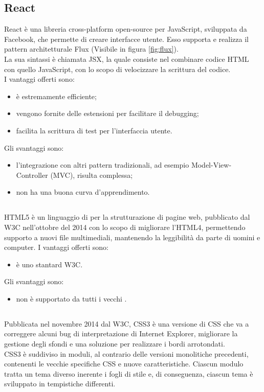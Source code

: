 \subsection{React}
React è una libreria cross-platform open-source per JavaScript, sviluppata da Facebook, che permette di creare interfacce utente. Esso supporta e realizza il pattern architetturale Flux (Visibile in figura \ref{fig:flux}). \\
La sua sintassi è chiamata JSX, la quale consiste nel combinare codice HTML con quello JavaScript, con lo scopo di velocizzare la scrittura del codice.\\
I vantaggi offerti sono:
\begin{itemize}
	\item è estremamente efficiente;
	\item vengono fornite delle estensioni per facilitare il debugging;
	\item facilita la scrittura di test per l'interfaccia utente.
\end{itemize}
Gli svantaggi sono:
\begin{itemize}
	\item l'integrazione con altri pattern tradizionali, ad esempio Model-View-Controller (MVC), risulta complessa;
	\item non ha una buona curva d'apprendimento.
\end{itemize}
\subsection{}
HTML5 è un linguaggio di  per la strutturazione di pagine web, pubblicato dal W3C nell’ottobre del 2014 con lo scopo di migliorare l’HTML4, permettendo supporto a nuovi file multimediali, mantenendo la leggibilità da parte di uomini e computer.
I vantaggi offerti sono:
\begin{itemize}
	\item è uno stantard W3C.
\end{itemize}
Gli svantaggi sono:
\begin{itemize}
	\item non è supportato da tutti i vecchi .
\end{itemize}
\subsection{}
Pubblicata nel novembre 2014 dal W3C, CSS3 è una versione di CSS che va a correggere alcuni bug di interpretazione di Internet Explorer, migliorare la gestione degli sfondi e una soluzione per realizzare i bordi arrotondati.\\
CSS3 è suddiviso in moduli, al contrario delle versioni monolitiche precedenti, contenenti le vecchie specifiche CSS e nuove caratteristiche. Ciascun modulo tratta un tema diverso inerente i fogli di stile e, di conseguenza, ciascun tema è sviluppato in tempistiche differenti.
